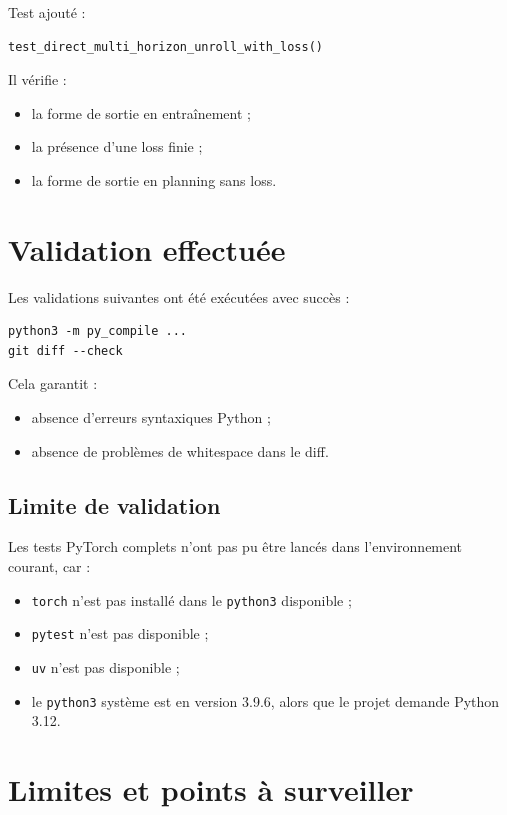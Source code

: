 \documentclass[11pt,a4paper]{article}
\newcommand{\code}[1]{\texttt{#1}}
\begin{document}
Test ajouté :

\begin{lstlisting}[language=Python]
test_direct_multi_horizon_unroll_with_loss()
\end{lstlisting}

Il vérifie :

\begin{itemize}
  \item la forme de sortie en entraînement ;
  \item la présence d'une loss finie ;
  \item la forme de sortie en planning sans loss.
\end{itemize}

\section{Validation effectuée}

Les validations suivantes ont été exécutées avec succès :

\begin{lstlisting}
python3 -m py_compile ...
git diff --check
\end{lstlisting}

Cela garantit :

\begin{itemize}
  \item absence d'erreurs syntaxiques Python ;
  \item absence de problèmes de whitespace dans le diff.
\end{itemize}

\subsection{Limite de validation}

Les tests PyTorch complets n'ont pas pu être lancés dans l'environnement courant, car :

\begin{itemize}
  \item \code{torch} n'est pas installé dans le \code{python3} disponible ;
  \item \code{pytest} n'est pas disponible ;
  \item \code{uv} n'est pas disponible ;
  \item le \code{python3} système est en version 3.9.6, alors que le projet demande Python 3.12.
\end{itemize}

\section{Limites et points à surveiller}
\end{document}
